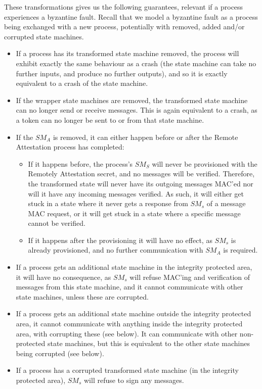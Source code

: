 \documentclass{article}
\begin{document}
	These transformations gives us the following guarantees, relevant if a process experiences a byzantine fault.
	Recall that we model a byzantine fault as a process being exchanged with a new process, potentially with removed, added and/or corrupted state machines.
	\begin{itemize}
		\item If a process has its transformed state machine removed, the process will exhibit exactly the same behaviour as a crash (the state machine can take no further inputs, and produce no further outputs), and so it is exactly equivalent to a crash of the state machine.
		\item If the wrapper state machines are removed, the transformed state machine can no longer send or receive messages.
		This is again equivalent to a crash, as a token can no longer be sent to or from that state machine.
		\item If the $SM_A$ is removed, it can either happen before or after the Remote Attestation process has completed:
		\begin{itemize}
			\item If it happens before, the process's $SM_S$ will never be provisioned with the Remotely Attestation secret, and no messages will be verified.
			Therefore, the transformed state will never have its outgoing messages MAC'ed nor will it have any incoming messages verified.
			As such, it will either get stuck in a state where it never gets a response from $SM_s$ of a message MAC request, or it will get stuck in a state where a specific message cannot be verified.
			\item If it happens after the provisioning it will have no effect, as $SM_s$ is already provisioned, and no further communication with $SM_A$ is required.
		\end{itemize}
		\item If a process gets an additional state machine in the integrity protected area, it will have no consequence, as $SM_s$ will refuse MAC'ing and verification of messages from this state machine, and it cannot communicate with other state machines, unless these are corrupted.
		\item If a process gets an additional state machine outside the integrity protected area, it cannot communicate with anything inside the integrity protected area, with corrupting these (see below).
		It can communicate with other non-protected state machines, but this is equivalent to the other state machines being corrupted (see below).
		\item If a process has a corrupted transformed state machine (in the integrity protected area), $SM_s$ will refuse to sign any messages.

\end{itemize}
\end{document}

